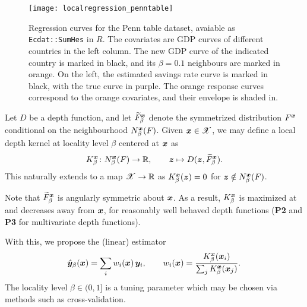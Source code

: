 \begin{figure}
    \centering
    \texttt{[image: localregression\_penntable]}
    \caption{
        Regression curves for the Penn table dataset, avaiable as
        \texttt{Ecdat::SumHes} in $R$.
        The covariates are GDP curves of different countries in the left
        column.
        The new GDP curve of the indicated country is marked in black, and its
        $\beta = 0.1$ neighbours are marked in orange.
        On the left, the estimated savings rate curve is marked in black, with
        the true curve in purple.
        The orange response curves correspond to the orange covariates, and
        their envelope is shaded in.
    }
    \label{fig:localregression_penn}
\end{figure}


\begin{definition}
    Let $D$ be a depth function, and let $\widetilde{F}^{\bm{x}}_\beta$ denote
    the symmetrized distribution $F^{\bm{x}}$ conditional on the neighbourhood
    $N^{\bm{x}}_\beta(F)$.
    Given $\bm{x} \in \mathscr{X}$, we may define a local depth kernel at
    locality level $\beta$ centered at $\bm{x}$ as
    \begin{equation}
        K^{\bm{x}}_\beta\colon N^{\bm{x}}_\beta(F) \to \mathbb{R}, \qquad
        \bm{z} \mapsto D(\bm{z}, \widetilde{F}^{\bm{x}}_\beta).
    \end{equation}
    This naturally extends to a map $\mathscr{X} \to \mathbb{R}$ as
    $K^{\bm{x}}_\beta(\bm{z}) = 0$ for $\bm{z} \notin N^{\bm{x}}_\beta(F)$.
\end{definition}

Note that $\widetilde{F}^{\bm{x}}_\beta$ is angularly symmetric about $\bm{x}$.
As a result, $K^{\bm{x}}_\beta$ is maximized at and decreases away from $\bm{x}$,
for reasonably well behaved depth functions (\textbf{P2} and \textbf{P3} for
multivariate depth functions).


With this, we propose the (linear) estimator
\begin{equation}
    \hat{\bm{y}}_\beta(\bm{x}) = \sum_i w_i(\bm{x})\, \bm{y}_i, \qquad
    w_i(\bm{x}) = \frac{K^{\bm{x}}_\beta(\bm{x}_i)}{\sum_j K^{\bm{x}}_\beta(\bm{x}_j)}.
    \label{eq:localregression}
\end{equation}
The locality level $\beta \in (0, 1]$ is a tuning parameter which may be
chosen via methods such as cross-validation.

